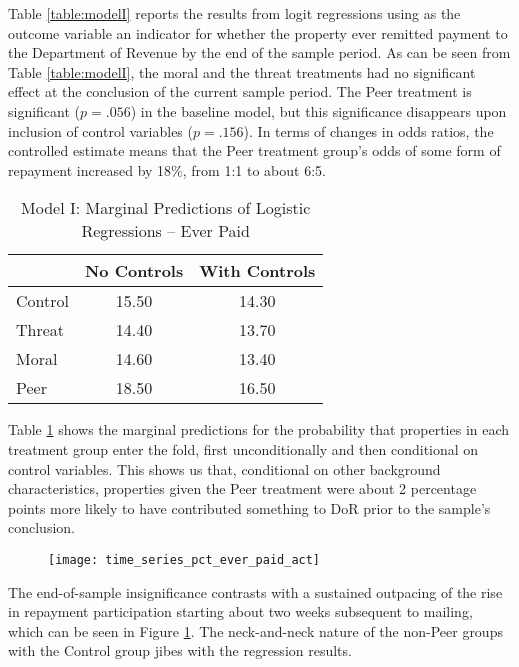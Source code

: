 \documentclass[12pt,titlepage]{article}
\begin{document}
Table \ref{table:modelI} reports the results from logit regressions using
as the outcome variable an indicator for whether the property ever remitted
payment to the Department of Revenue by the end of the sample period.
As can be seen from Table \ref{table:modelI}, the moral and the threat
treatments had no significant effect at the conclusion of the current sample
period. The Peer treatment is significant ($p=.056$) in the baseline model, but
this significance disappears upon inclusion of control variables
($p=.156$). In terms of changes in odds ratios, the controlled estimate means that the 
Peer treatment group's odds of some form of repayment increased by 18\%,
from 1:1 to about 6:5.

\begin{table}[htbp]
\centering
\begin{tabular}{lcc}
  \hline
 & No Controls & With Controls \\ 
  \hline
Control & 15.50 & 14.30 \\ 
  Threat & 14.40 & 13.70 \\ 
  Moral & 14.60 & 13.40 \\ 
  Peer & 18.50 & 16.50 \\ 
   \hline
\end{tabular}
\caption{Model I: Marginal Predictions of Logistic Regressions -- Ever Paid} 
\label{table:modelI_marg}
\end{table}

Table \ref{table:modelI_marg} shows the marginal predictions for the probability
that properties in each treatment group enter the fold, first unconditionally and
then conditional on control variables. This shows us that, conditional on other
background characteristics, properties given the Peer treatment were about 2
percentage points more likely to have contributed something to DoR prior to the
sample's conclusion.

\begin{figure}[htbp]
\caption{}\label{ever_paid_act}
\begin{center}
\texttt{[image: time\_series\_pct\_ever\_paid\_act]}
\par\end{center}
\end{figure}

The end-of-sample insignificance contrasts with a sustained outpacing
of the rise in repayment participation starting about two weeks
subsequent to mailing, which can be seen in Figure
\ref{ever_paid_act}. The neck-and-neck nature of the non-Peer groups with
the Control group jibes with the regression results.
\end{document}

